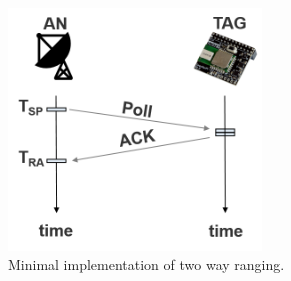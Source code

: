 \begin{figure}[th]
\centering
\includegraphics[width=0.6\textwidth]{Figures/simple_TWR}
\decoRule
\caption[Minimal Two Way Ranging]{Minimal implementation of two way ranging.}
\label{fig:simple_TWR}
\end{figure}


